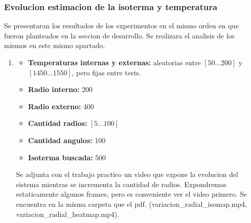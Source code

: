 \subsubsection{Evolucion estimacion de la isoterma y temperatura}
Se presentaran los resultados de los experimentos en el mismo orden en que fueron planteados en la seccion de desarrollo. Se realizara el analisis de los mismos en este mismo apartado.
\begin{enumerate}
	\item \begin{itemize}
				\item \textbf{Temperaturas internas y externas:} aleatorias entre $[50\dots200]$ y $[1450\dots1550]$, pero fijas entre tests.
				\item \textbf{Radio interno:} 200
				\item \textbf{Radio externo:} 400
				\item \textbf{Cantidad radios:} $[5\dots100]$
				\item \textbf{Cantidad angulos:} 100
				\item \textbf{Isoterma buscada:} 500
			\end{itemize}
Se adjunta con el trabajo practico un video que expone la evolucion del sistema mientras se incrementa la cantidad de radios. Expondremos estaticamente algunos frames, pero es conveniente ver el video primero. Se encuentra en la misma carpeta que el pdf. (variacion\_radial\_isomap.mp4, variacion\_radial\_heatmap.mp4).

\vspace{0.5cm}


\end{enumerate}
